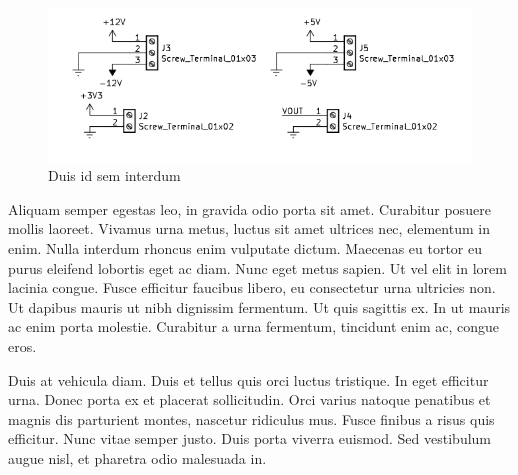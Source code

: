 \begin{figure}[h]
    \centering
    \includegraphics[width=\textwidth]{figures/chapterC/out.png}
    \caption{Duis id sem interdum}
    \label{C_out}
\end{figure}

Aliquam semper egestas leo, in gravida odio porta sit amet. Curabitur posuere mollis laoreet. Vivamus urna metus, luctus sit amet ultrices nec, elementum in enim. Nulla interdum rhoncus enim vulputate dictum. Maecenas eu tortor eu purus eleifend lobortis eget ac diam. Nunc eget metus sapien. Ut vel elit in lorem lacinia congue. Fusce efficitur faucibus libero, eu consectetur urna ultricies non. Ut dapibus mauris ut nibh dignissim fermentum. Ut quis sagittis ex. In ut mauris ac enim porta molestie. Curabitur a urna fermentum, tincidunt enim ac, congue eros.

Duis at vehicula diam. Duis et tellus quis orci luctus tristique. In eget efficitur urna. Donec porta ex et placerat sollicitudin. Orci varius natoque penatibus et magnis dis parturient montes, nascetur ridiculus mus. Fusce finibus a risus quis efficitur. Nunc vitae semper justo. Duis porta viverra euismod. Sed vestibulum augue nisl, et pharetra odio malesuada in. 



